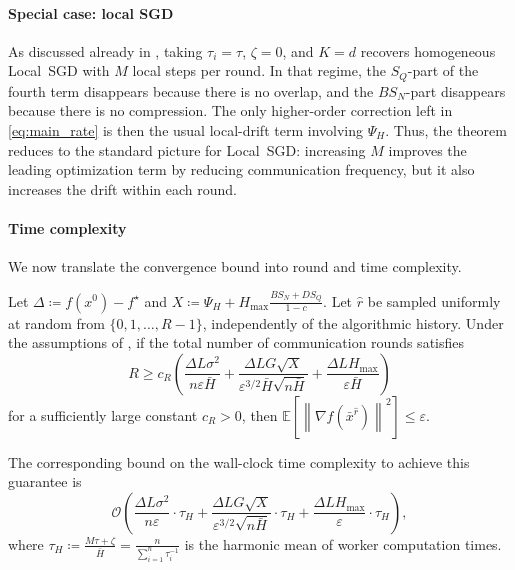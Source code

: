 \documentclass{article}
\newcommand{\norm}[1]{{\left\| #1 \right\|}}
\newcommand{\rbr}[1]{\left(#1\right)} %
\newcommand{\eqdef}{\coloneqq}
\newcommand{\Exp}[1]{{\mathbb{E}} \left[ #1 \right]}
\theoremstyle{plain}
\theoremstyle{definition}
\newcommand{\algname}[1]{{\color{alggray}\small\sf#1}\xspace}
\newcommand{\localsgd}{\algname{Local~SGD}}
\begin{document}
\paragraph{Special case: local SGD}
As discussed already in , taking \(\tau_i=\tau\), \(\zeta=0\), and \(K=d\) recovers homogeneous \localsgd with \(M\) local steps per round.
In that regime, the \(S_Q\)-part of the fourth term disappears because there is no overlap, and the \(BS_N\)-part disappears because there is no compression.
The only higher-order correction left in \eqref{eq:main_rate} is then the usual local-drift term involving \(\Psi_H\).
Thus, the theorem reduces to the standard picture for \localsgd: increasing \(M\) improves the leading optimization term by reducing communication frequency, but it also increases the drift within each round.
% 
\paragraph{Time complexity}\label{par:time_complexity} 
We now translate the convergence bound into round and time complexity.
% 
\begin{corollary}\label{corollary:time_complexity}
    Let $\Delta \eqdef f(x^0)-f^\star$ and $X \eqdef \Psi_H + H_{\max}\frac{BS_N + DS_Q}{1-c}$. 
    Let $\hat{r}$ be sampled uniformly at random from $\{0, 1, \ldots, R-1\}$, independently of the algorithmic history.
    Under the assumptions of , if the total number of communication rounds satisfies
    \begin{equation*}
        R \ge c_R \left( \frac{\Delta L \sigma^2}{n \varepsilon \bar{H}} + \frac{\Delta L G \sqrt{X}}{\varepsilon^{3/2} \bar{H} \sqrt{n \bar H}} + \frac{\Delta L H_{\max}}{\varepsilon \bar{H}} \right)
    \end{equation*}
    for a sufficiently large constant $c_R > 0$, then $\Exp{\norm{\nabla f(\bar x^{\hat{r}})}^2} \le \varepsilon$.
    
    The corresponding bound on the wall-clock time complexity to achieve this guarantee is
    \begin{equation*}
        \mathcal{O}\rbr{\frac{\Delta L \sigma^2}{n \varepsilon} \cdot \tau_H + \frac{\Delta L G \sqrt{X}}{\varepsilon^{3/2} \sqrt{n \bar H}} \cdot \tau_H + \frac{\Delta L H_{\max}}{\varepsilon} \cdot \tau_H},
    \end{equation*}
    where $\tau_H \eqdef \frac{M\tau+\zeta}{\bar H} = \frac{n}{\sum_{i=1}^n \tau_i^{-1}}$ is the harmonic mean of worker computation times.
\end{corollary}
\end{document}
